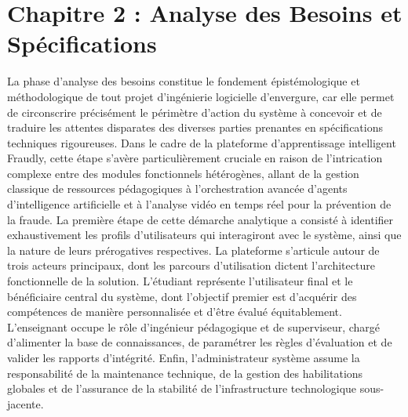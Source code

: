 \section{Chapitre 2 : Analyse des Besoins et Spécifications}

La phase d'analyse des besoins constitue le fondement épistémologique et méthodologique de tout projet d'ingénierie logicielle d'envergure, car elle permet de circonscrire précisément le périmètre d'action du système à concevoir et de traduire les attentes disparates des diverses parties prenantes en spécifications techniques rigoureuses. Dans le cadre de la plateforme d'apprentissage intelligent Fraudly, cette étape s'avère particulièrement cruciale en raison de l'intrication complexe entre des modules fonctionnels hétérogènes, allant de la gestion classique de ressources pédagogiques à l'orchestration avancée d'agents d'intelligence artificielle et à l'analyse vidéo en temps réel pour la prévention de la fraude. La première étape de cette démarche analytique a consisté à identifier exhaustivement les profils d'utilisateurs qui interagiront avec le système, ainsi que la nature de leurs prérogatives respectives. La plateforme s'articule autour de trois acteurs principaux, dont les parcours d'utilisation dictent l'architecture fonctionnelle de la solution. L'étudiant représente l'utilisateur final et le bénéficiaire central du système, dont l'objectif premier est d'acquérir des compétences de manière personnalisée et d'être évalué équitablement. L'enseignant occupe le rôle d'ingénieur pédagogique et de superviseur, chargé d'alimenter la base de connaissances, de paramétrer les règles d'évaluation et de valider les rapports d'intégrité. Enfin, l'administrateur système assume la responsabilité de la maintenance technique, de la gestion des habilitations globales et de l'assurance de la stabilité de l'infrastructure technologique sous-jacente.

